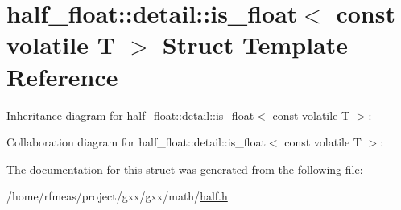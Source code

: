 \hypertarget{structhalf__float_1_1detail_1_1is__float_3_01const_01volatile_01T_01_4}{}\section{half\+\_\+float\+:\+:detail\+:\+:is\+\_\+float$<$ const volatile T $>$ Struct Template Reference}
\label{structhalf__float_1_1detail_1_1is__float_3_01const_01volatile_01T_01_4}


Inheritance diagram for half\+\_\+float\+:\+:detail\+:\+:is\+\_\+float$<$ const volatile T $>$\+:


Collaboration diagram for half\+\_\+float\+:\+:detail\+:\+:is\+\_\+float$<$ const volatile T $>$\+:


The documentation for this struct was generated from the following file\+:\begin{DoxyCompactItemize}
\item 
/home/rfmeas/project/gxx/gxx/math/\hyperlink{half_8h}{half.\+h}\end{DoxyCompactItemize}
